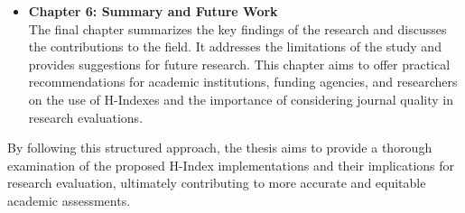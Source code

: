 \begin{itemize}
    \item \textbf{Chapter 6: Summary and Future Work} \\
    The final chapter summarizes the key findings of the research and discusses
    the contributions to the field. It addresses the limitations of the study and provides
    suggestions for future research. This chapter aims to offer practical recommendations
    for academic institutions, funding agencies, and researchers on the use of H-Indexes and the
    importance of considering journal quality in research evaluations.
\end{itemize}

By following this structured approach, the thesis aims to provide a thorough examination
of the proposed H-Index implementations and their implications for research evaluation,
ultimately contributing to more accurate and equitable academic assessments.

